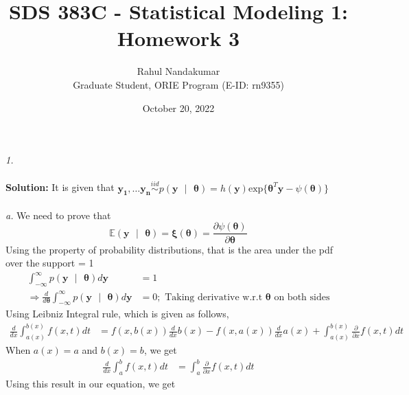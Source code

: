 \documentclass[11pt]{article}
\title{SDS 383C - Statistical Modeling 1: Homework 3}
\author{Rahul Nandakumar \\ Graduate Student, ORIE Program (E-ID: rn9355)}
\date{October 20, 2022}
\begin{document}
\maketitle
\noindent \emph{1.}\\ \\
\textbf{Solution:} It is given that $\mathbf{y_{1}, \dots y_{n}} \overset{iid}{\sim} p(\mathbf{y \text{ }|\text{ } \bm{\theta}}) = h(\mathbf{y})\text{exp}\{\bm{\theta}^{T}\mathbf{y} - \psi(\bm{\theta})\}$\\ \\
\emph{a.} We need to prove that
\begin{equation}
  \nonumber
  \mathbb{E}(\mathbf{y} \text{ }|\text{ } \bm{\theta}) = \bm{\xi}({\bm{\theta}}) = \frac{\partial \psi(\bm{\theta})}{\partial \bm{\theta}}
\end{equation}
Using the property of probability distributions, that is the area under the pdf over the support = 1
\begin{equation}
  \nonumber
  \begin{aligned}
    \int_{-\infty}^{\infty} p(\mathbf{y \text{ }|\text{ } \bm{\theta}})d\mathbf{y} & = 1\\
    \Rightarrow \frac{d}{d \bm{\theta}} \int_{-\infty}^{\infty} p(\mathbf{y \text{ }|\text{ } \bm{\theta}})d\mathbf{y} & = 0; \text{ Taking derivative w.r.t }\bm{\theta}\text{ on both sides}
  \end{aligned}
\end{equation}
Using Leibniz Integral rule, which is given as follows,
\begin{equation}
  \nonumber
  \begin{aligned}
    \frac{d}{dx} \int_{a(x)}^{b(x)} f(x, t)dt & = f(x, b(x))\frac{d}{dx}b(x) - f(x, a(x))\frac{d}{dx}a(x) + \int_{a(x)}^{b(x)}\frac{\partial}{\partial x}f(x,t)dt
  \end{aligned}
\end{equation}
When $a(x) = a$ and $b(x) = b$, we get
\begin{equation}
  \nonumber
  \begin{aligned}
    \frac{d}{dx} \int_{a}^{b} f(x, t)dt & = \int_{a}^{b}\frac{\partial}{\partial x}f(x,t)dt
  \end{aligned}
\end{equation}
Using this result in our equation, we get
\end{document}
